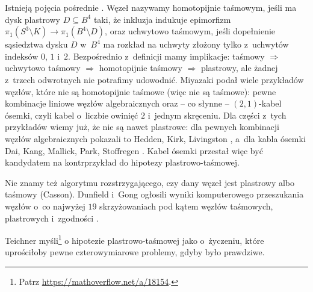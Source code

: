 Istnieją pojęcia pośrednie \cite[problem 1.50]{baykur2026}.
Węzeł nazywamy homotopijnie taśmowym, jeśli ma dysk plastrowy $D \subseteq B^4$ taki, że inkluzja indukuje epimorfizm $\pi_1(S^3 \setminus K) \to \pi_1(B^4 \setminus D)$, oraz uchwytowo taśmowym, jeśli dopełnienie sąsiedztwa dysku $D$ w~$B^4$ ma rozkład na uchwyty złożony tylko z~uchwytów indeksów $0$, $1$ i~$2$.
%
%
Bezpośrednio z~definicji mamy implikacje: taśmowy $\Rightarrow$ uchwytowo taśmowy $\Rightarrow$ homotopijnie taśmowy $\Rightarrow$ plastrowy, ale żadnej z~trzech odwrotnych nie potrafimy udowodnić.
Miyazaki \cite{miyazaki1994} podał wiele przykładów węzłów, które nie są homotopijnie taśmowe (więc nie są taśmowe): pewne kombinacje liniowe węzłów algebraicznych oraz -- co słynne -- $(2,1)$-kabel ósemki, czyli kabel o~liczbie owinięć $2$ i~jednym skręceniu.
Dla części z~tych przykładów wiemy już, że nie są nawet plastrowe: dla pewnych kombinacji węzłów algebraicznych pokazali to Hedden, Kirk, Livingston \cite{hedden2012}, a~dla kabla ósemki Dai, Kang, Mallick, Park, Stoffregen \cite{dai2024}.
%
%
%
%
%
Kabel ósemki przestał więc być kandydatem na kontrprzykład do hipotezy plastrowo-taśmowej.

Nie znamy też algorytmu rozstrzygającego, czy dany węzeł jest plastrowy albo taśmowy (Casson).
Dunfield i~Gong ogłosili wyniki komputerowego przeszukania węzłów o~co najwyżej $19$ skrzyżowaniach pod kątem węzłów taśmowych, plastrowych i~zgodności \cite[problem 1.52]{baykur2026}.
%

Teichner myśli\footnote{Patrz \url{https://mathoverflow.net/a/18154}.} o hipotezie plastrowo-taśmowej jako o~życzeniu, które uprościłoby pewne czterowymiarowe problemy, gdyby było prawdziwe.
%



